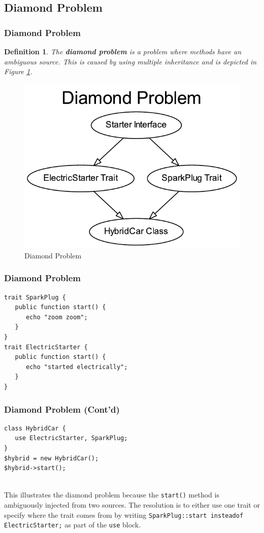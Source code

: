 \documentclass[aspectratio=169]{beamer}
\newtheorem{defn}{Definition}
\begin{document}
\subsection{Diamond Problem}
\begin{frame}
\frametitle{Diamond Problem}
\begin{defn}
The \textbf{diamond problem} is a problem where methods have an ambiguous source. This is caused by using multiple inheritance and is depicted in Figure \ref{fig:diamond}.
\end{defn}
\begin{figure}
\includegraphics[scale=0.4]{../artifacts/diamond.pdf}
\caption{Diamond Problem}
\label{fig:diamond}
\end{figure}
\end{frame}

\begin{frame}[fragile]
\frametitle{Diamond Problem}
\begin{lstlisting}[caption=Diamond Problem Using Traits,label=lis:traits]
trait SparkPlug {
   public function start() {
      echo "zoom zoom";
   }
}
trait ElectricStarter {
   public function start() {
      echo "started electrically";
   }
}
\end{lstlisting}
\end{frame}

\begin{frame}[fragile]
\frametitle{Diamond Problem (Cont'd)}
\begin{lstlisting}[caption=Diamond Problem Using Traits (Cont'd),label=lis:diamond-class]
class HybridCar {
   use ElectricStarter, SparkPlug;
}
$hybrid = new HybridCar();
$hybrid->start();
\end{lstlisting}

\mbox{}\\
This illustrates the diamond problem because the \texttt{start()} method is ambiguously injected from two sources. The resolution is to either use one trait or specify where the trait comes from by writing \texttt{SparkPlug::start insteadof ElectricStarter;} as part of the \texttt{use} block.
\end{frame}
\end{document}

